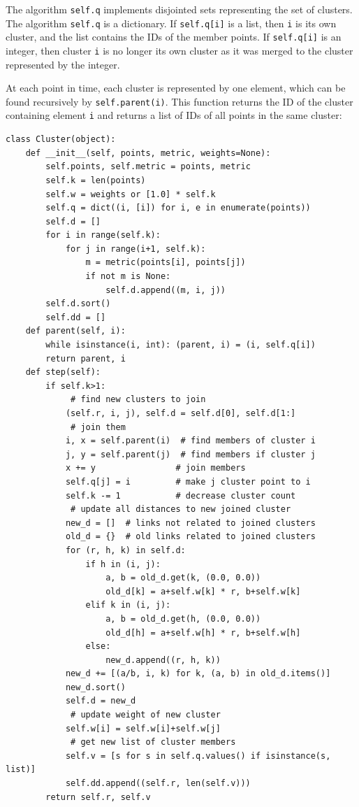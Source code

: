 \documentclass[justified, sixbynine]{tufte-book}
\def\ft{\small\tt}
\theoremstyle{plain}%
\newtheorem * {corollary}{Corollary}
\theoremstyle{definition}
\theoremstyle{remark}
\newtheorem * {remark}{Remark}
\newtheorem * {note}{Note}
\begin{document}
\begin{fullwidth}
The algorithm {\ft self.q} implements disjointed sets representing the set of clusters. The algorithm {\ft self.q} is a dictionary. If {\ft self.q[i]} is a list, then {\ft i} is its own cluster, and the list contains the IDs of the member points. If  {\ft self.q[i]} is an integer, then cluster {\ft i} is no longer its own cluster as it was merged to the cluster represented by the integer.

At each point in time, each cluster is represented by one element, which can be found recursively by {\ft self.parent(i)}. This function returns the ID of the cluster containing element {\ft i} and returns a list of IDs of all points in the same cluster:


\begin{lstlisting}[caption={in file: {\ft nlib.py}}]
class Cluster(object):
    def __init__(self, points, metric, weights=None):
        self.points, self.metric = points, metric
        self.k = len(points)
        self.w = weights or [1.0] * self.k
        self.q = dict((i, [i]) for i, e in enumerate(points))
        self.d = []
        for i in range(self.k):
            for j in range(i+1, self.k):
                m = metric(points[i], points[j])
                if not m is None:
                    self.d.append((m, i, j))
        self.d.sort()
        self.dd = []
    def parent(self, i):
        while isinstance(i, int): (parent, i) = (i, self.q[i])
        return parent, i
    def step(self):
        if self.k>1:
             # find new clusters to join
            (self.r, i, j), self.d = self.d[0], self.d[1:]
             # join them
            i, x = self.parent(i)  # find members of cluster i
            j, y = self.parent(j)  # find members if cluster j
            x += y                # join members
            self.q[j] = i         # make j cluster point to i
            self.k -= 1           # decrease cluster count
             # update all distances to new joined cluster
            new_d = []  # links not related to joined clusters
            old_d = {}  # old links related to joined clusters
            for (r, h, k) in self.d:
                if h in (i, j):
                    a, b = old_d.get(k, (0.0, 0.0))
                    old_d[k] = a+self.w[k] * r, b+self.w[k]
                elif k in (i, j):
                    a, b = old_d.get(h, (0.0, 0.0))
                    old_d[h] = a+self.w[h] * r, b+self.w[h]
                else:
                    new_d.append((r, h, k))
            new_d += [(a/b, i, k) for k, (a, b) in old_d.items()]
            new_d.sort()
            self.d = new_d
             # update weight of new cluster
            self.w[i] = self.w[i]+self.w[j]
             # get new list of cluster members
            self.v = [s for s in self.q.values() if isinstance(s, list)]
            self.dd.append((self.r, len(self.v)))
        return self.r, self.v


\end{lstlisting}
\end{fullwidth}
\end{document}

